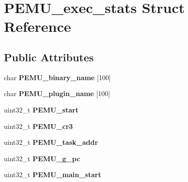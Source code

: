 \hypertarget{structPEMU__exec__stats}{\section{\-P\-E\-M\-U\-\_\-exec\-\_\-stats \-Struct \-Reference}
\label{structPEMU__exec__stats}
}
\subsection*{\-Public \-Attributes}
\begin{DoxyCompactItemize}
\item 
\hypertarget{structPEMU__exec__stats_aa3d04fc3c7960b12fdd4b44e82b95b04}{char {\bfseries \-P\-E\-M\-U\-\_\-binary\-\_\-name} \mbox{[}100\mbox{]}}\label{structPEMU__exec__stats_aa3d04fc3c7960b12fdd4b44e82b95b04}

\item 
\hypertarget{structPEMU__exec__stats_a45b9fb3d4595e278bf913743f6946d83}{char {\bfseries \-P\-E\-M\-U\-\_\-plugin\-\_\-name} \mbox{[}100\mbox{]}}\label{structPEMU__exec__stats_a45b9fb3d4595e278bf913743f6946d83}

\item 
\hypertarget{structPEMU__exec__stats_a0f5e4616fb0e2e6faec55e5c5abcacf7}{uint32\-\_\-t {\bfseries \-P\-E\-M\-U\-\_\-start}}\label{structPEMU__exec__stats_a0f5e4616fb0e2e6faec55e5c5abcacf7}

\item 
\hypertarget{structPEMU__exec__stats_a240009adb1a58ca48bc8cbacd2e1fa31}{uint32\-\_\-t {\bfseries \-P\-E\-M\-U\-\_\-cr3}}\label{structPEMU__exec__stats_a240009adb1a58ca48bc8cbacd2e1fa31}

\item 
\hypertarget{structPEMU__exec__stats_a1c204f38220da414155b0cabae7b6d8d}{uint32\-\_\-t {\bfseries \-P\-E\-M\-U\-\_\-task\-\_\-addr}}\label{structPEMU__exec__stats_a1c204f38220da414155b0cabae7b6d8d}

\item 
\hypertarget{structPEMU__exec__stats_a5a9fda7b3c7657f2a5760889dc64344b}{uint32\-\_\-t {\bfseries \-P\-E\-M\-U\-\_\-g\-\_\-pc}}\label{structPEMU__exec__stats_a5a9fda7b3c7657f2a5760889dc64344b}

\item 
\hypertarget{structPEMU__exec__stats_a9df688ab65b364ffbb5e6b42d8cd5fc0}{uint32\-\_\-t {\bfseries \-P\-E\-M\-U\-\_\-main\-\_\-start}}\label{structPEMU__exec__stats_a9df688ab65b364ffbb5e6b42d8cd5fc0}


\end{DoxyCompactItemize}
